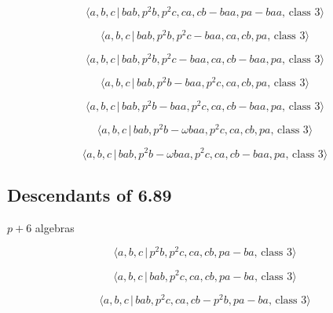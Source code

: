 \documentclass[10pt]{article}
\begin{document}
\begin{equation}
\langle a,b,c\,|\,bab,p^2b,p^2c,ca,cb-baa,pa-baa,\,\text{class }3\rangle 
\tag{7.2654}
\end{equation}

\begin{equation}
\langle a,b,c\,|\,bab,p^2b,p^2c-baa,ca,cb,pa,\,\text{class }3\rangle 
\tag{7.2655}
\end{equation}

\begin{equation}
\langle a,b,c\,|\,bab,p^2b,p^2c-baa,ca,cb-baa,pa,\,\text{class }3\rangle 
\tag{7.2656}
\end{equation}

\begin{equation}
\langle a,b,c\,|\,bab,p^2b-baa,p^2c,ca,cb,pa,\,\text{class }3\rangle 
\tag{7.2657}
\end{equation}

\begin{equation}
\langle a,b,c\,|\,bab,p^2b-baa,p^2c,ca,cb-baa,pa,\,\text{class }3\rangle 
\tag{7.2658}
\end{equation}

\begin{equation}
\langle a,b,c\,|\,bab,p^{2}b-\omega baa,p^{2}c,ca,cb,pa,\,\text{class }%
3\rangle  \tag{7.2659}
\end{equation}

\begin{equation}
\langle a,b,c\,|\,bab,p^{2}b-\omega baa,p^{2}c,ca,cb-baa,pa,\,\text{class }%
3\rangle  \tag{7.2660}
\end{equation}

\subsection{Descendants of 6.89}

$p+6$ algebras

\begin{equation}
\langle a,b,c\,|\,p^2b,p^2c,ca,cb,pa-ba,\,\text{class }3\rangle  \tag{7.2661}
\end{equation}

\begin{equation}
\langle a,b,c\,|\,bab,p^2c,ca,cb,pa-ba,\,\text{class }3\rangle  \tag{7.2662}
\end{equation}

\begin{equation}
\langle a,b,c\,|\,bab,p^2c,ca,cb-p^2b,pa-ba,\,\text{class }3\rangle 
\tag{7.2663}
\end{equation}
\end{document}
